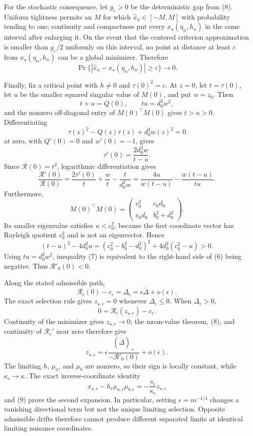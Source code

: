 For the stochastic consequence, let \(g_\varepsilon>0\) be the deterministic gap from (8).  Uniform tightness permits an \(M\) for which \(\widehat x_n\in[-M,M]\) with probability tending to one; continuity and compactness put every \(x_\star(\eta_n,h_n)\) in the same interval after enlarging it.  On the event that the centered criterion approximation is smaller than \(g_\varepsilon/2\) uniformly on this interval, no point at distance at least \(\varepsilon\) from \(x_\star(\eta_n,h_n)\) can be a global minimizer.  Therefore
\[
 \Pr\{|\widehat x_n-x_\star(\eta_n,h_n)|\geq\varepsilon\}\longrightarrow0.
\]

Finally, fix a critical point with \(h\neq0\) and \(\tau(0)^2=c\).  At \(z=0\), let \(t=\tau(0)\), let \(u\) be the smaller squared singular value of \(M(0)\), and put \(w=z_0\).  Then
\[
 t+u=Q(0),\qquad tu=d_0^2w^2,
\]
and the nonzero off-diagonal entry of \(M(0)^{\top}M(0)\) gives \(t>u>0\).  Differentiating
\[
 \tau(z)^2-Q(z)\tau(z)+d_0^2w(z)^2=0
\]
at zero, with \(Q'(0)=0\) and \(w'(0)=-1\), gives
\[
 \tau'(0)=\frac{2d_0^2w}{t-u}.
\]
Since \(\mathcal R(0)=t^2\), logarithmic differentiation gives
\[
 \frac{\mathcal R'(0)}{\mathcal R(0)}
 =\frac{2\tau'(0)}t+\frac wt-\frac{t}{d_0^2w}
 =\frac{4u}{w(t-u)}-\frac{w(t-u)}{tu}. \tag{6}
\]
Furthermore,
\[
 M(0)^{\top}M(0)
 =\begin{pmatrix}c_0^2&c_0d_0\\c_0d_0&b_0^2+d_0^2\end{pmatrix}.
\]
Its smaller eigenvalue satisfies \(u<c_0^2\), because the first coordinate vector has Rayleigh quotient \(c_0^2\) and is not an eigenvector.  Hence
\[
 (t-u)^2-4d_0^2u
 =(c_0^2-b_0^2-d_0^2)^2+4d_0^2(c_0^2-u)>0. \tag{7}
\]
Using \(tu=d_0^2w^2\), inequality (7) is equivalent to the right-hand side of (6) being negative.  Thus \(\mathcal R'_0(0)<0\).

Along the stated admissible path,
\[
 \mathcal R_\epsilon(0)-c_\epsilon
 =\Delta_\epsilon
 =\epsilon\dot\Delta+o(\epsilon). \tag{8}
\]
The exact selection rule gives \(z_{\star,\epsilon}=0\) whenever \(\Delta_\epsilon\leq0\).  When \(\Delta_\epsilon>0\),
\[
 0=\mathcal R_\epsilon(z_{\star,\epsilon})-c_\epsilon.
\]
Continuity of the minimizer gives \(z_{\star,\epsilon}\to0\); the mean-value theorem, (8), and continuity of \(\mathcal R_\epsilon'\) near zero therefore give
\[
 z_{\star,\epsilon}
 =\epsilon\frac{(\dot\Delta)_+}{-\mathcal R'_0(0)}+o(\epsilon). \tag{9}
\]
The limiting \(h\), \(\mu_a\), and \(\mu_b\) are nonzero, so their sign is locally constant, while \(\kappa_\epsilon\to\kappa\).  The exact inverse-coordinate identity
\[
 x_{\star,\epsilon}-h_\epsilon\mu_{a,\epsilon}\mu_{b,\epsilon}
 =-\frac{s_\epsilon}{\kappa_\epsilon}z_{\star,\epsilon}
\]
and (9) prove the second expansion.  In particular, setting \(\epsilon=m^{-1/4}\) changes a vanishing directional term but not the unique limiting selection.  Opposite admissible drifts therefore cannot produce different separated limits at identical limiting nuisance coordinates.
